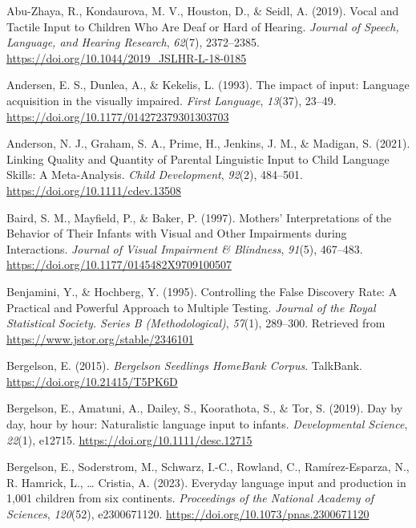 \documentclass[
  man]{apa6}
\newlength{\cslhangindent}
\newlength{\cslentryspacingunit} %
\newenvironment{CSLReferences}[2] %
 {%
  \setlength{\parindent}{0pt}
  \ifodd #1
  \let\oldpar\par
  \def\par{\hangindent=\cslhangindent\oldpar}
  \fi
  \setlength{\parskip}{#2\cslentryspacingunit}
 }%
 {}
\begin{document}
\hypertarget{refs}{}
\begin{CSLReferences}{1}{0}
\leavevmode{}%
Abu-Zhaya, R., Kondaurova, M. V., Houston, D., \& Seidl, A. (2019). Vocal and {Tactile Input} to {Children Who Are Deaf} or {Hard} of {Hearing}. \emph{Journal of Speech, Language, and Hearing Research}, \emph{62}(7), 2372--2385. \url{https://doi.org/10.1044/2019_JSLHR-L-18-0185}

\leavevmode{}%
Andersen, E. S., Dunlea, A., \& Kekelis, L. (1993). The impact of input: Language acquisition in the visually impaired. \emph{First Language}, \emph{13}(37), 23--49. \url{https://doi.org/10.1177/014272379301303703}

\leavevmode{}%
Anderson, N. J., Graham, S. A., Prime, H., Jenkins, J. M., \& Madigan, S. (2021). Linking {Quality} and {Quantity} of {Parental Linguistic Input} to {Child Language Skills}: {A Meta-Analysis}. \emph{Child Development}, \emph{92}(2), 484--501. \url{https://doi.org/10.1111/cdev.13508}

\leavevmode{}%
Baird, S. M., Mayfield, P., \& Baker, P. (1997). Mothers' {Interpretations} of the {Behavior} of {Their Infants} with {Visual} and {Other Impairments} during {Interactions}. \emph{Journal of Visual Impairment \& Blindness}, \emph{91}(5), 467--483. \url{https://doi.org/10.1177/0145482X9709100507}

\leavevmode{}%
Benjamini, Y., \& Hochberg, Y. (1995). Controlling the {False Discovery Rate}: {A Practical} and {Powerful Approach} to {Multiple Testing}. \emph{Journal of the Royal Statistical Society. Series B (Methodological)}, \emph{57}(1), 289--300. Retrieved from \url{https://www.jstor.org/stable/2346101}

\leavevmode{}%
Bergelson, E. (2015). \emph{Bergelson {Seedlings HomeBank Corpus}}. TalkBank. \url{https://doi.org/10.21415/T5PK6D}

\leavevmode{}%
Bergelson, E., Amatuni, A., Dailey, S., Koorathota, S., \& Tor, S. (2019). Day by day, hour by hour: {Naturalistic} language input to infants. \emph{Developmental Science}, \emph{22}(1), e12715. \url{https://doi.org/10.1111/desc.12715}

\leavevmode{}%
Bergelson, E., Soderstrom, M., Schwarz, I.-C., Rowland, C., Ramírez-Esparza, N., R. Hamrick, L., \ldots{} Cristia, A. (2023). Everyday language input and production in 1,001 children from six continents. \emph{Proceedings of the National Academy of Sciences}, \emph{120}(52), e2300671120. \url{https://doi.org/10.1073/pnas.2300671120}


\end{CSLReferences}
\end{document}
